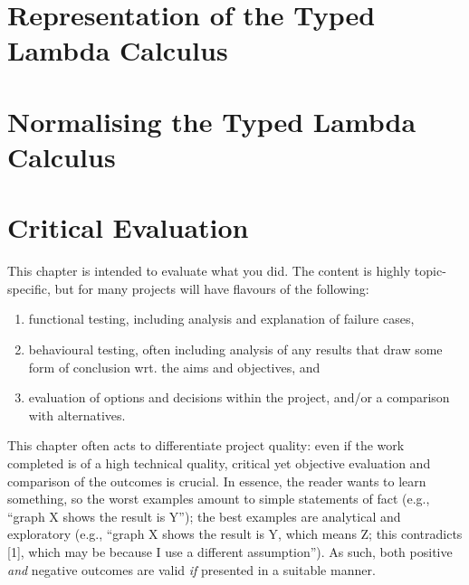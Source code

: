 \documentclass[ %
                    author={Lucas O'Dowd-Jones},
                supervisor={Dr. Alex Kavvos},
                    degree={MEng},
                     title={Variations on Normalisation by Evaluation in Haskell},
                  subtitle={},
                      type={programming languages},
                      year={2021} ]{dissertation}
\begin{document}

\chapter{Representation of the Typed Lambda Calculus}
\label{chap:typedlamadacalculus}


\chapter{Normalising the Typed Lambda Calculus}
\label{chap:typednbe}


\chapter{Critical Evaluation}
\label{chap:evaluation}


\noindent
This chapter is intended to evaluate what you did.  The content is highly 
topic-specific, but for many projects will have flavours of the following:

\begin{enumerate}
\item functional  testing, including analysis and explanation of failure 
      cases,
\item behavioural testing, often including analysis of any results that 
      draw some form of conclusion wrt. the aims and objectives,
      and
\item evaluation of options and decisions within the project, and/or a
      comparison with alternatives.
\end{enumerate}

\noindent
This chapter often acts to differentiate project quality: even if the work
completed is of a high technical quality, critical yet objective evaluation 
and comparison of the outcomes is crucial.  In essence, the reader wants to
learn something, so the worst examples amount to simple statements of fact 
(e.g., ``graph X shows the result is Y''); the best examples are analytical 
and exploratory (e.g., ``graph X shows the result is Y, which means Z; this 
contradicts [1], which may be because I use a different assumption'').  As 
such, both positive {\em and} negative outcomes are valid {\em if} presented 
in a suitable manner.
\end{document}
